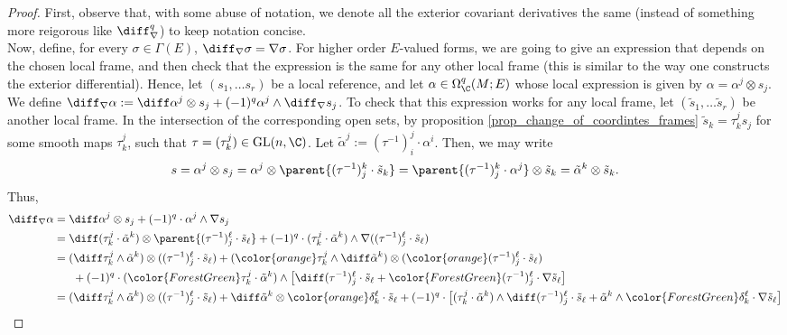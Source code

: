 \begin{proof}
    First, observe that, with some abuse of notation, we denote all the exterior covariant derivatives the same (instead of something more reigorous like \(\diff_\nabla^q\)) to keep notation concise. \\

    Now, define, for every \(\sigma \in \Gamma(E)\), \(\diff_\nabla\sigma=\nabla \sigma\). For higher order \(E\)-valued forms, we are going to give an expression that depends on the chosen local frame, and then check that the expression is the same for any other local frame (this is similar to the way one constructs the exterior differential). Hence, let \((s_1, \ldots s_r)\) be a local reference, and let \(\alpha \in \Omega_\C^q(M;E)\) whose local expression is given by \(\alpha = \alpha ^j \otimes s_j\). We define \(\diff_\nabla \alpha:=\diff \alpha^j \otimes s_j + (-1)^q \alpha ^j \wedge \diff_\nabla s_j \). To check that this expression works for any local frame, let \((\tilde{s}_1, \ldots \tilde{s}_r)\) be another local frame. In the intersection of the corresponding open sets, by proposition \ref{prop_change_of_coordintes_frames} \(\tilde{s}_k=\tau^j_k s_j\) for some smooth maps \(\tau^j_k\), such that \(\tau=(\tau^j_k) \in \mathrm{GL}(n,\C)\). Let \(\tilde{\alpha}^j:=(\tau^{-1})_i^j \cdot  \alpha^i\). Then, we may write
    \[
    s=\alpha^j \otimes s_j = \alpha^j \otimes \parent{(\tau^{-1})^k_j \cdot \tilde{s}_k} = \parent{(\tau^{-1})^k_j \cdot \alpha^j} \otimes \tilde{s}_k =\tilde{\alpha}^k \otimes \tilde{s}_k.
    \]  
    Thus,
    \begin{align*}
        \diff_\nabla \alpha & = \diff \alpha^j \otimes s_j + (-1)^q \cdot  \alpha^j \wedge \nabla s_j \\
        & = \diff (\tau^j_k \cdot \tilde{\alpha}^k) \otimes \parent{(\tau^{-1})^\ell_j \cdot \tilde{s}_\ell} + (-1)^q \cdot (\tau^j_k \cdot \tilde{\alpha}^k) \wedge \nabla ((\tau^{-1})^\ell_j \cdot \tilde{s}_\ell) \\
        & =(\diff \tau^j_k \wedge \tilde{\alpha}^k) \otimes((\tau^{-1})^\ell_j \cdot \tilde{s}_\ell)+ ({\color{orange}\tau^j_k} \wedge \diff \tilde{\alpha}^k) \otimes ({\color{orange}(\tau^{-1})^\ell_j} \cdot \tilde{s}_\ell) \\
        & \ \ \ \ \  + (-1)^q \cdot ({\color{ForestGreen}\tau^j_k} \cdot \tilde{\alpha}^k) \wedge \big[ \diff(\tau^{-1})^\ell_j \cdot \tilde{s}_\ell + {\color{ForestGreen}(\tau^{-1})^\ell_j}  \cdot \nabla \tilde{s}_\ell\big] \\
        & = (\diff \tau^j_k \wedge \tilde{\alpha}^k) \otimes((\tau^{-1})^\ell_j \cdot \tilde{s}_\ell)+  \diff \tilde{\alpha}^k \otimes  {\color{orange}\delta_k^\ell} \cdot  \tilde{s}_\ell + (-1)^q \cdot \big[  (\tau^j_k \cdot \tilde{\alpha}^k) \wedge \diff(\tau^{-1})^\ell_j \cdot \tilde{s}_\ell + \tilde{\alpha}^k \wedge {\color{ForestGreen}\delta^\ell_k} \cdot \nabla \tilde{s}_\ell\big] \\

\end{align*}
\end{proof}
